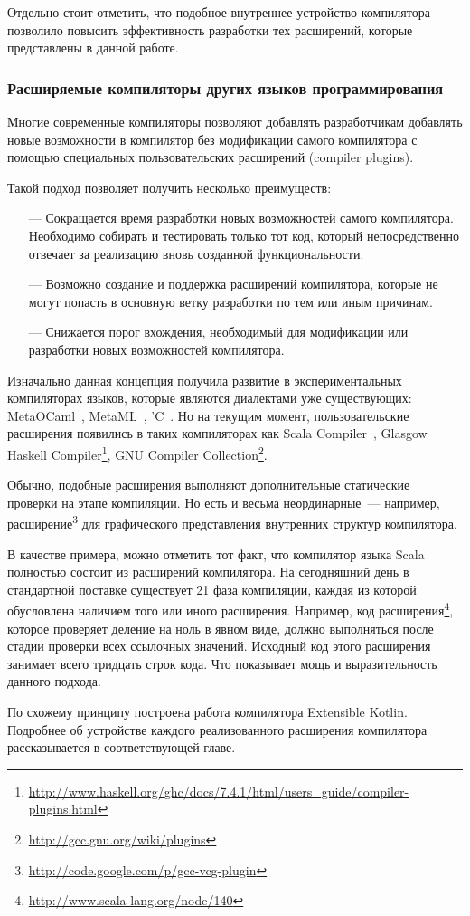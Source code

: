 Отдельно стоит отметить, что подобное внутреннее устройство компилятора позволило повысить эффективность разработки тех расширений, которые представлены в данной работе.

\subsubsection{Расширяемые компиляторы других языков программирования}
Многие современные компиляторы позволяют добавлять разработчикам добавлять новые возможности в компилятор без модификации самого компилятора с помощью специальных пользовательских расширений (compiler plugins).

Такой подход позволяет получить несколько преимуществ:
\begin{itemize}
\item[---] Сокращается время разработки новых возможностей самого компилятора. Необходимо собирать и тестировать только тот код, который непосредственно отвечает за реализацию вновь созданной функциональности.
\item[---] Возможно создание и поддержка расширений компилятора, которые не могут попасть в основную ветку разработки по тем или иным причинам.
\item[---] Снижается порог вхождения, необходимый для модификации или разработки новых возможностей компилятора.
\end{itemize}

Изначально данная концепция получила развитие в экспериментальных компиляторах языков, которые являются диалектами уже существующих: MetaOCaml~\cite{metaocaml}, MetaML~\cite{metaml}, 'C~\cite{extendible-c}.
Но на текущим момент, пользовательские расширения появились в таких компиляторах как
Scala Compiler~\cite{scala-spec},
Glasgow Haskell Compiler\footnote{\url{http://www.haskell.org/ghc/docs/7.4.1/html/users_guide/compiler-plugins.html}}, GNU Compiler Collection\footnote{\url{http://gcc.gnu.org/wiki/plugins}}.

Обычно, подобные расширения выполняют дополнительные статические проверки на этапе компиляции. Но есть и весьма неординарные~--- например, расширение\footnote{\url{http://code.google.com/p/gcc-vcg-plugin}} для графического представления внутренних структур компилятора.

В качестве примера, можно отметить тот факт, что компилятор языка Scala полностью состоит из расширений компилятора. На сегодняшний день в стандартной поставке существует 21 фаза компиляции, каждая из которой обусловлена наличием того или иного расширения. Например, код расширения\footnote{\url{http://www.scala-lang.org/node/140}}, которое проверяет деление на ноль в явном виде, должно выполняться после стадии проверки всех ссылочных значений. Исходный код этого расширения занимает всего тридцать строк кода. Что показывает мощь и выразительность данного подхода.

По схожему принципу построена работа компилятора Extensible Kotlin. Подробнее об устройстве каждого реализованного расширения компилятора рассказывается в соответствующей главе.
